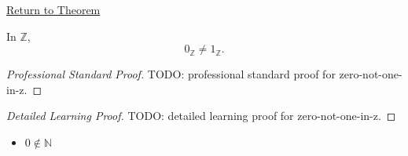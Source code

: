 \newpage
{}
\label{prf:zero-not-one-in-z}

\begin{remark*}[Return]
\hyperref[thm:zero-not-one-in-z]{Return to Theorem}
\end{remark*}

\begin{theorem*}
In $\mathbb{Z}$,
\[
0_{\mathbb{Z}}\ne 1_{\mathbb{Z}}.
\]
\end{theorem*}

\begin{proof}[Professional Standard Proof]
\LRAProofBodyStart
TODO: professional standard proof for zero-not-one-in-z.
\end{proof}

\begin{proof}[Detailed Learning Proof]
\LRAProofBodyStart
TODO: detailed learning proof for zero-not-one-in-z.
\end{proof}

\begin{remark*}
\end{remark*}

\begin{dependencies}
\begin{itemize}
  \item \hyperref[thm:zero-not-in-n]{$0\notin\mathbb{N}$}
\end{itemize}
\end{dependencies}

\clearpage
